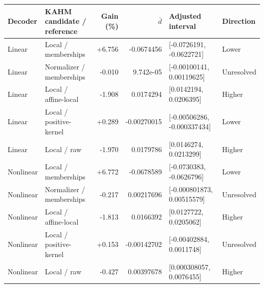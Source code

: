 \begin{tabular}{llrrll}
\toprule
Decoder & KAHM candidate / reference & Gain (\%) & $\bar d$ & Adjusted interval & Direction \\
\midrule
Linear & Local / memberships & +6.756 & -0.0674456 & [-0.0726191, -0.0622721] & Lower \\
Linear & Normalizer / memberships & -0.010 & 9.742e-05 & [-0.00100141, 0.00119625] & Unresolved \\
Linear & Local / affine-local & -1.908 & 0.0174294 & [0.0142194, 0.0206395] & Higher \\
Linear & Local / positive-kernel & +0.289 & -0.00270015 & [-0.00506286, -0.000337434] & Lower \\
Linear & Local / raw & -1.970 & 0.0179786 & [0.0146274, 0.0213299] & Higher \\
\midrule
Nonlinear & Local / memberships & +6.772 & -0.0678589 & [-0.0730383, -0.0626796] & Lower \\
Nonlinear & Normalizer / memberships & -0.217 & 0.00217696 & [-0.000801873, 0.00515579] & Unresolved \\
Nonlinear & Local / affine-local & -1.813 & 0.0166392 & [0.0127722, 0.0205062] & Higher \\
Nonlinear & Local / positive-kernel & +0.153 & -0.00142702 & [-0.00402884, 0.0011748] & Unresolved \\
Nonlinear & Local / raw & -0.427 & 0.00397678 & [0.000308057, 0.0076455] & Higher \\
\bottomrule
\end{tabular}
